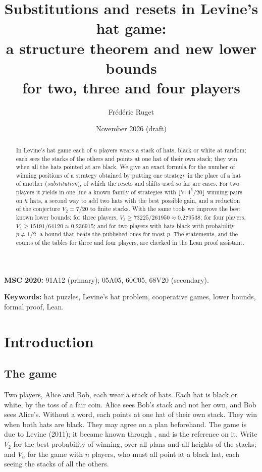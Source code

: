 \documentclass[11pt,a4paper]{article}
\title{Substitutions and resets in Levine's hat game:\\
a structure theorem and new lower bounds\\
for two, three and four players}
\author{Fr\'ed\'eric Ruget}
\date{November 2026 (draft)}
\theoremstyle{definition}
\theoremstyle{remark}
\begin{document}
\maketitle

\begin{abstract}
In Levine's hat game each of $n$ players wears a stack of hats, black or
white at random; each sees the stacks of the others and points at one hat
of their own stack; they win when all the hats pointed at are black. We
give an exact formula for the number of winning positions of a strategy
obtained by putting one strategy in the place of a hat of another
(\emph{substitution}), of which the resets and shifts used so far are
cases. For two players it yields in one line a known family of strategies
with $\lfloor 7\cdot 4^h/20\rfloor$ winning pairs on $h$ hats, a second way to add two hats with the best possible
gain, and a reduction of the conjecture $V_2 = 7/20$ to finite stacks.
With the same tools we improve the best known lower bounds: for three
players, $V_3 \ge 73225/261950 \approx 0.279538$; for four players,
$V_4 \ge 15191/64120 \approx 0.236915$; and for two players with hats
black with probability $p \ne 1/2$, a bound that beats the published
ones for most $p$. The statements, and the counts of the tables for three
and four players, are checked in the Lean proof assistant.
\end{abstract}

\noindent\textbf{MSC 2020:} 91A12 (primary); 05A05, 60C05, 68V20
(secondary).

\noindent\textbf{Keywords:} hat puzzles, Levine's hat problem,
cooperative games, lower bounds, formal proof, Lean.

\section{Introduction}

\subsection{The game}

Two players, Alice and Bob, each wear a stack of hats. Each hat is black
or white, by the toss of a fair coin. Alice sees Bob's stack and not her
own, and Bob sees Alice's. Without a word, each points at one hat of their
own stack. They win when both hats are black. They may agree on a plan
beforehand. The game is due to Levine (2011); it became known through
\cite{Kh11}, and \cite{BFG} is the reference on it. Write $V_2$ for the
best probability of winning, over all plans and all heights of the
stacks; and $V_n$ for the game with $n$ players, who must all point at a
black hat, each seeing the stacks of all the others.
\end{document}
